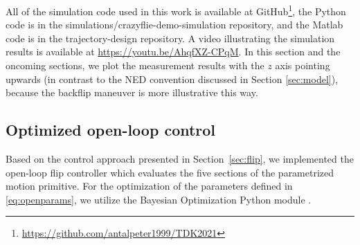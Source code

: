 All of the simulation code used in this work is available at GitHub\footnote{\url{https://github.com/antalpeter1999/TDK2021}}, the Python code is in the simulations/crazyflie-demo-simulation repository, and the Matlab code is in the trajectory-design repository. A video illustrating the simulation results is available at \url{https://youtu.be/AhqfXZ-CPqM}. In this section and the oncoming sections, we plot the measurement results with the $z$ axis pointing upwards (in contrast to the NED convention discussed in Section \ref{sec:model}), because the backflip maneuver is more illustrative this way.

\subsection{Optimized open-loop control}\label{sec:opensimu}
Based on the control approach presented in Section~\ref{sec:flip}, we implemented the open-loop flip controller which evaluates the five sections of the parametrized motion primitive. For the optimization of the parameters defined in \eqref{eq:openparams}, we utilize the Bayesian Optimization Python module \cite{bayesopt}.%

